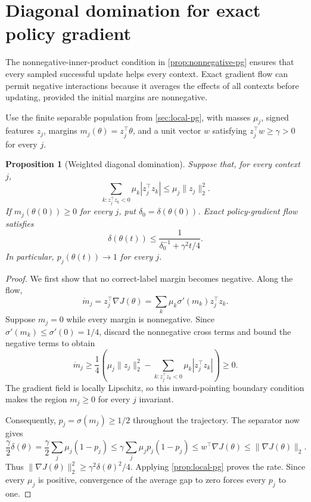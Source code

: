 \documentclass[11pt,twoside]{article}
\newtheorem{proposition}[theorem]{Proposition}
\theoremstyle{definition}
\theoremstyle{remark}
\begin{document}
\section{Diagonal domination for exact policy gradient}
\label{app:diagonal-pg}

The nonnegative-inner-product condition in
\cref{prop:nonnegative-pg} ensures that every sampled successful update
helps every context. Exact gradient flow can permit negative interactions
because it averages the effects of all contexts before updating, provided
the initial margins are nonnegative.

Use the finite separable population from \cref{sec:local-pg}, with masses
$\mu_j$, signed features $z_j$, margins $m_j(\theta)=z_j^\top\theta$, and a
unit vector $w$ satisfying $z_j^\top w\ge\gamma>0$ for every $j$.

\begin{proposition}[Weighted diagonal domination]
\label{prop:diagonal-pg}
Suppose that, for every context $j$,
\begin{equation}
 \sum_{k:z_j^\top z_k<0}\mu_k|z_j^\top z_k|
 \le \mu_j\|z_j\|_2^2.
 \label{eq:diagonal-domination}
\end{equation}
If $m_j(\theta(0))\ge0$ for every $j$, put
$\delta_0=\delta(\theta(0))$. Exact policy-gradient flow satisfies
\[
 \delta(\theta(t))
 \le\frac{1}{\delta_0^{-1}+\gamma^2t/4}.
\]
In particular, $p_j(\theta(t))\to1$ for every $j$.
\end{proposition}
\begin{proof}
We first show that no correct-label margin becomes negative. Along the flow,
\[
 \dot m_j
 =z_j^\top\nabla J(\theta)
 =\sum_k\mu_k\sigma'(m_k)z_j^\top z_k.
\]
Suppose $m_j=0$ while every margin is nonnegative. Since
$\sigma'(m_k)\le\sigma'(0)=1/4$, discard the nonnegative cross terms and
bound the negative terms to obtain
\[
 \dot m_j
 \ge\frac14\left(
 \mu_j\|z_j\|_2^2
 -\sum_{k:z_j^\top z_k<0}\mu_k|z_j^\top z_k|
 \right)\ge0.
\]
The gradient field is locally Lipschitz, so this inward-pointing boundary
condition makes the region $m_j\ge0$ for every $j$ invariant.

Consequently, $p_j=\sigma(m_j)\ge1/2$ throughout the trajectory. The
separator now gives
\[
 \frac\gamma2\delta(\theta)
 =\frac\gamma2\sum_j\mu_j(1-p_j)
 \le\gamma\sum_j\mu_jp_j(1-p_j)
 \le w^\top\nabla J(\theta)
 \le\|\nabla J(\theta)\|_2.
\]
Thus $\|\nabla J(\theta)\|_2^2\ge\gamma^2\delta(\theta)^2/4$.
Applying \cref{prop:local-pg} proves the rate. Since every $\mu_j$ is
positive, convergence of the average gap to zero forces every $p_j$ to one.
\end{proof}
\end{document}
